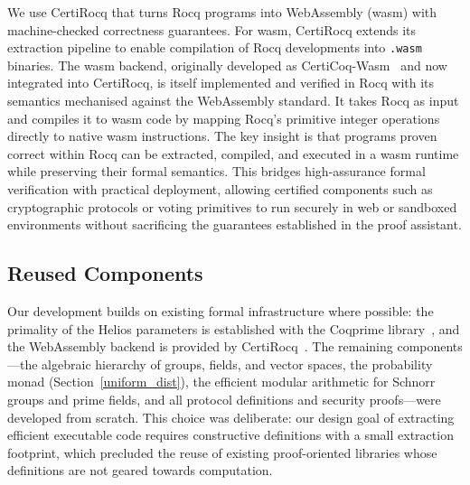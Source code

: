 \documentclass[sigconf,anonymous,review]{acmart}
\begin{document}
We use CertiRocq \cite{anand2017certicoq} that turns Rocq programs into WebAssembly (wasm) with machine-checked correctness guarantees. For wasm, CertiRocq extends its extraction pipeline to enable compilation of Rocq developments into \texttt{.wasm} binaries. The wasm backend, originally developed as CertiCoq-Wasm~\cite{meier2025certicoq} and now integrated into CertiRocq, is itself implemented and verified in Rocq with its semantics mechanised against the WebAssembly standard. It takes Rocq as input and compiles it to wasm code by mapping Rocq's primitive integer operations directly to native wasm instructions. The key insight is that programs proven correct within Rocq can be extracted, compiled, and executed in a wasm runtime while preserving their formal semantics. This bridges high-assurance formal verification with practical deployment, allowing certified components such as cryptographic protocols or voting primitives to run securely in web or sandboxed environments without sacrificing the guarantees established in the proof assistant.

\subsection{Reused Components}\label{reused_comp}
Our development builds on existing formal infrastructure where possible: the primality of the Helios parameters is established with the Coqprime library~\cite{thery2007primality}, and the WebAssembly backend is provided by CertiRocq~\cite{anand2017certicoq,meier2025certicoq}. The remaining components---the algebraic hierarchy of groups, fields, and vector spaces, the probability monad (Section~\ref{uniform_dist}), the efficient modular arithmetic for Schnorr groups and prime fields, and all protocol definitions and security proofs---were developed from scratch. This choice was deliberate: our design goal of extracting efficient executable code requires constructive definitions with a small extraction footprint, which precluded the reuse of existing proof-oriented libraries whose definitions are not geared towards computation.
\end{document}
